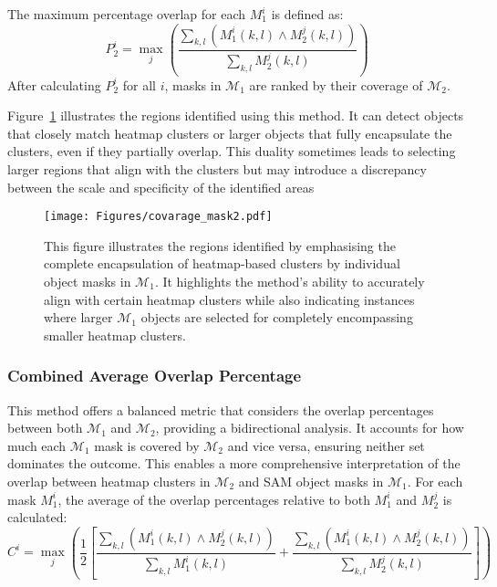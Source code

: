 The maximum percentage overlap for each \( M_1^i \) is defined as:
\begin{equation*}
P_2^i = \max_j \left( \frac{\sum_{k, l} \left( M_1^i(k, l) \land M_2^j(k, l) \right)}{\sum_{k, l} M_2^j(k, l)} \right)
\end{equation*}
After calculating \( P_2^i \) for all \( i \), masks in \(\mathcal{M}_1\) are ranked by their coverage of \(\mathcal{M}_2\).

Figure~\ref{Fig:covarage_mask2} illustrates the regions identified using this method. It can detect objects that closely match heatmap clusters or larger objects that fully encapsulate the clusters, even if they partially overlap. This duality sometimes leads to selecting larger regions that align with the clusters but may introduce a discrepancy between the scale and specificity of the identified areas

\begin{figure}[ht!]
\begin{center}
\texttt{[image: Figures/covarage\_mask2.pdf]}
\end{center}
\caption{This figure illustrates the regions identified by emphasising the complete encapsulation of heatmap-based clusters by individual object masks in $\mathcal{M}_1$. It highlights the method's ability to accurately align with certain heatmap clusters while also indicating instances where larger $\mathcal{M}_1$ objects are selected for completely encompassing smaller heatmap clusters.}
\label{Fig:covarage_mask2}
\end{figure} 

\subsubsection{Combined Average Overlap Percentage}

This method offers a balanced metric that considers the overlap percentages between both \(\mathcal{M}_1\) and \(\mathcal{M}_2\), providing a bidirectional analysis. It accounts for how much each \(\mathcal{M}_1\) mask is covered by \(\mathcal{M}_2\) and vice versa, ensuring neither set dominates the outcome. This enables a more comprehensive interpretation of the overlap between heatmap clusters in \(\mathcal{M}_2\) and SAM object masks in \(\mathcal{M}_1\). For each mask \( M_1^i \), the average of the overlap percentages relative to both \( M_1^i \) and \( M_2^j \) is calculated:
\begin{equation*}
C^i = \max_j \left( \frac{1}{2} \left[ \frac{\sum_{k, l} \left( M_1^i(k, l) \land M_2^j(k, l) \right)}{\sum_{k, l} M_1^i(k, l)} + \frac{\sum_{k, l} \left( M_1^i(k, l) \land M_2^j(k, l) \right)}{\sum_{k, l} M_2^j(k, l)} \right] \right)
\end{equation*}

